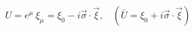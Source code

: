 \begin{equation}
U=e^{\mu} ~\xi_{\mu} = \xi_{0}-i\vec{\sigma} \cdot
\vec{\xi},~~~~(\bar{U}=\xi_{0}+i\vec{\sigma} \cdot \vec{\xi})      \label{6.1}
\end{equation}

